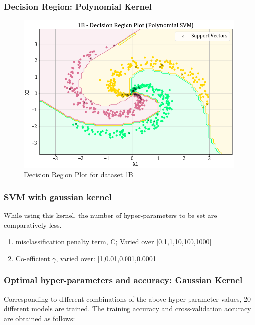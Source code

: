 \documentclass[11pt,a4paper]{article}
\newcommand{\noi}{\noindent}
\begin{document}
\subsubsection{Decision Region: Polynomial Kernel}

\begin{figure}[H]
    \centering
    \includegraphics[scale=0.5]{images/1B_SVM_poly_decision_plot.png}
    \caption{Decision Region Plot for dataset 1B}
    \label{myfig:poly_db}
\end{figure}

\subsubsection{SVM with gaussian kernel}\label{section:gaussian}

While using this kernel, the number of hyper-parameters to be set are comparatively less.
\begin{enumerate}
    \item misclassification penalty term, C; Varied over [0.1,1,10,100,1000]
    \item Co-efficient $\gamma$, varied over: [1,0.01,0.001,0.0001]
\end{enumerate}

\subsubsection{Optimal hyper-parameters and accuracy: Gaussian Kernel}

Corresponding to different combinations of the above hyper-parameter values, 20 different models are trained. The training accuracy and cross-validation accuracy are obtained as follows:  
\noi

\end{document}
